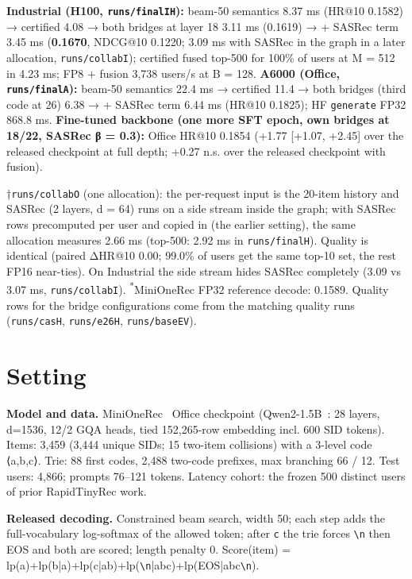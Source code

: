 \documentclass[11pt]{article}
\newcommand{\nl}{\texttt{\textbackslash n}}
\newcommand{\code}[1]{\texttt{#1}}
\begin{document}
\textbf{Industrial (H100, \code{runs/\allowbreak{}finalIH}):} beam-50 semantics 8.37 ms (HR@10 0.1582) → certified 4.08 → both bridges at layer 18 3.11 ms (0.1619) → + SASRec term 3.45 ms (\textbf{0.1670}, NDCG@10 0.1220; 3.09 ms with SASRec in the graph in a later allocation, \code{runs/\allowbreak{}collabI}); certified fused top-500 for 100\% of users at M = 512 in 4.23 ms; FP8 + fusion 3,738 users/s at B = 128. \textbf{A6000 (Office, \code{runs/\allowbreak{}finalA}):} beam-50 semantics 22.4 ms → certified 11.4 → both bridges (third code at 26) 6.38 → + SASRec term 6.44 ms (HR@10 0.1825); HF \code{generate} FP32 868.8 ms. \textbf{Fine-tuned backbone (one more SFT epoch, own bridges at 18/22, SASRec β = 0.3):} Office HR@10 0.1854 (+1.77 [+1.07, +2.45] over the released checkpoint at full depth; +0.27 n.s. over the released checkpoint with fusion).

†\code{runs/\allowbreak{}collabO} (one allocation): the per-request input is the 20-item history and SASRec (2 layers, d = 64) runs on a side stream inside the graph; with SASRec rows precomputed per user and copied in (the earlier setting), the same allocation measures 2.66 ms (top-500: 2.92 ms in \code{runs/\allowbreak{}finalH}). Quality is identical (paired ΔHR@10 0.00; 99.0\% of users get the same top-10 set, the rest FP16 near-ties). On Industrial the side stream hides SASRec completely (3.09 vs 3.07 ms, \code{runs/\allowbreak{}collabI}). \textsuperscript{*}MiniOneRec FP32 reference decode: 0.1589. Quality rows for the bridge configurations come from the matching quality runs (\code{runs/\allowbreak{}casH}, \code{runs/\allowbreak{}e26H}, \code{runs/\allowbreak{}baseEV}).

\section{Setting}\label{sec:2}

\textbf{Model and data.} MiniOneRec~\cite{ax2510.24431} Office checkpoint (Qwen2-1.5B~\cite{ax2407.10671}: 28 layers, d=1536, 12/2 GQA heads, tied 152,265-row embedding incl. 600 SID tokens). Items: 3,459 (3,444 unique SIDs; 15 two-item collisions) with a 3-level code ⟨a,b,c⟩. Trie: 88 first codes, 2,488 two-code prefixes, max branching 66 / 12. Test users: 4,866; prompts 76–121 tokens. Latency cohort: the frozen 500 distinct users of prior RapidTinyRec work.

\textbf{Released decoding.} Constrained beam search, width 50; each step adds the full-vocabulary log-softmax of the allowed token; after \code{c} the trie forces \code{\textbackslash{}n} then EOS and both are scored; length penalty 0. Score(item) = lp(a)+lp(b|a)+lp(c|ab)+lp(\nl{}|abc)+lp(EOS|abc\nl{}).
\end{document}

